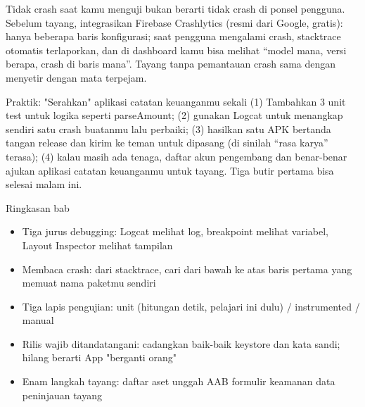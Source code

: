 
Tidak crash saat kamu menguji bukan berarti tidak crash di ponsel pengguna. Sebelum tayang, integrasikan Firebase Crashlytics (resmi dari Google, gratis): hanya beberapa baris konfigurasi; saat pengguna mengalami crash, stacktrace otomatis terlaporkan, dan di dashboard kamu bisa melihat “model mana, versi berapa, crash di baris mana”. Tayang tanpa pemantauan crash sama dengan menyetir dengan mata terpejam.

\begin{tcbpractice}{Praktik: "Serahkan" aplikasi catatan keuanganmu sekali}
(1) Tambahkan 3 unit test untuk logika seperti parseAmount; (2) gunakan Logcat untuk menangkap sendiri satu crash buatanmu lalu perbaiki; (3) hasilkan satu APK bertanda tangan release dan kirim ke teman untuk dipasang (di sinilah “rasa karya” terasa); (4) kalau masih ada tenaga, daftar akun pengembang dan benar-benar ajukan aplikasi catatan keuanganmu untuk tayang. Tiga butir pertama bisa selesai malam ini.

\end{tcbpractice}

\begin{tcbsummary}{Ringkasan bab}
\begin{itemize}
  \item Tiga jurus debugging: Logcat melihat log, breakpoint melihat variabel, Layout Inspector melihat tampilan
  \item Membaca crash: dari stacktrace, cari dari bawah ke atas baris pertama yang memuat nama paketmu sendiri
  \item Tiga lapis pengujian: unit (hitungan detik, pelajari ini dulu) / instrumented / manual
  \item Rilis wajib ditandatangani: cadangkan baik-baik keystore dan kata sandi; hilang berarti App "berganti orang"
  \item Enam langkah tayang: daftar aset unggah AAB formulir keamanan data peninjauan tayang
\end{itemize}

\end{tcbsummary}
